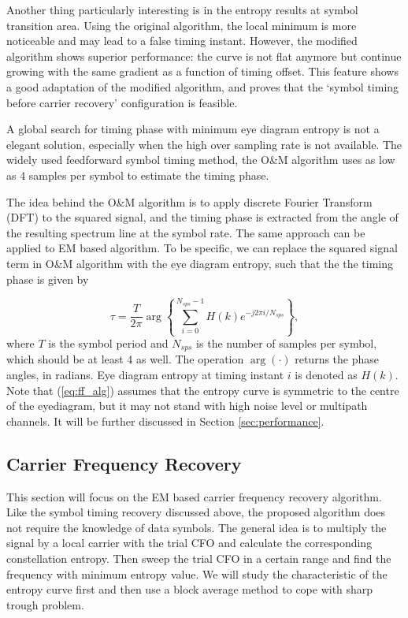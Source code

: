 \documentclass[journal,comsoc]{IEEEtran}
\begin{document}
Another thing particularly interesting is in the entropy results at symbol transition area.
Using the original algorithm, the local minimum is more noticeable and may lead to a false timing instant.
However, the modified algorithm shows superior performance:
the curve is not flat anymore but continue growing with the same gradient as a function of timing offset.
This feature shows a good adaptation of the modified algorithm, and proves that the `symbol timing before carrier recovery' configuration is feasible.

A global search for timing phase with minimum eye diagram entropy is not a elegant solution, especially when the high over sampling rate is not available.
The widely used feedforward symbol timing method, the O\&M algorithm uses as low as 4 samples per symbol to estimate the timing phase.

The idea behind the O\&M algorithm is to apply discrete Fourier Transform (DFT) to the squared signal,
and the timing phase is extracted from the angle of the resulting spectrum line at the symbol rate.
The same approach can be applied to EM based algorithm.
To be specific, we can replace the squared signal term in O\&M algorithm with the eye diagram entropy,
such that the the timing phase is given by

\begin{equation}
\tau  = \frac{T}{{2\pi }}\arg \left\{ {\sum\limits_{i = 0}^{N_{sps}-1} {H(k){e^{ - j2\pi i/N_{sps}}}} } \right\},
\label{eq:ff_alg}
\end{equation}
where \(T\) is the symbol period and \(N_{sps}\) is the number of samples per symbol, which should be at least 4 as well.
The operation \(\arg( \cdot )\) returns the phase angles, in radians.
Eye diagram entropy at timing instant \(i\) is denoted as \(H(k)\).
Note that (\ref{eq:ff_alg}) assumes that the entropy curve is symmetric to the centre of the eyediagram,
but it may not stand with high noise level or multipath channels.
It will be further discussed in Section \ref{sec:performance}.

\subsection{Carrier Frequency Recovery}
This section will focus on the EM based carrier frequency recovery algorithm.
Like the symbol timing recovery discussed above, the proposed algorithm does not require the knowledge of data symbols.
The general idea is to multiply the signal by a local carrier with the trial CFO and calculate the corresponding constellation entropy.
Then sweep the trial CFO in a certain range and find the frequency with minimum entropy value.
We will study the characteristic of the entropy curve first and then use a block average method to cope with sharp trough problem.
\end{document}
